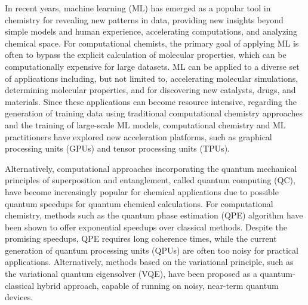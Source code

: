 \documentclass[journal=jacsat,manuscript=article]{achemso}
\begin{document}
In recent years, machine learning (ML) has emerged as a popular tool in chemistry for revealing new patterns in data, providing new insights beyond simple models and human experience, accelerating computations, and analyzing chemical space.
For computational chemists, the primary goal of applying ML is often to bypass the explicit calculation of molecular properties, which can be computationally expensive for large datasets.\cite{janet_machine_2020}
ML can be applied to a diverse set of applications including, but not limited to, accelerating molecular simulations\cite{behler_perspective_2016,ssmith_ani-1_2017,gao_torchani_2020}, determining molecular properties\cite{yang_analyzing_2019,ramakrishnan_quantum_2014,ramakrishnan_big_2015,hansen_machine_2015,unke_physnet_2019}, and for discovering new catalysts\cite{zhong_accelerated_2020,nandy_computational_2021,mjones_data-driven_2023}, drugs\cite{goh_deep_2017,yang_concepts_2019}, and materials.\cite{butler_machine_2018,sanchez-lengeling_inverse_2018,raccuglia_machine-learning-assisted_2016}
Since these applications can become resource intensive, regarding the generation of training data using traditional computational chemistry approaches and the training of large-scale ML models, computational chemistry and ML practitioners have explored new acceleration platforms, such as graphical processing units (GPUs) and tensor processing units (TPUs).\cite{ufimtsev_graphical_2008,gotz_chapter_2010,pederson_large_2023,goh_deep_2017,gawehn_advancing_2018,pandey_transformational_2022,ssmith_ani-1_2017}

Alternatively, computational approaches incorporating the quantum mechanical principles of superposition and entanglement, called quantum computing (QC), have become increasingly popular for chemical applications due to possible quantum speedups for quantum chemical calculations.\cite{cao_quantum_2019}
For computational chemistry, methods such as the quantum phase estimation (QPE)\cite{abrams_simulation_1997,abrams_quantum_1999,aspuru-guzik_simulated_2005,lanyon_towards_2010,whitfield_simulation_2011,aspuru-guzik_photonic_2012} algorithm have been shown to offer exponential speedups over classical methods.
Despite the promising speedups, QPE requires long coherence times, while the current generation of quantum processing units (QPUs) are often too noisy for practical applications.
Alternatively, methods based on the variational principle, such as the variational quantum eigensolver (VQE)\cite{peruzzo_variational_2014,cerezo_variational_2021,mcclean_theory_2016,bharti_noisy_2022}, have been proposed as a quantum-classical hybrid approach, capable of running on noisy, near-term quantum devices.
\end{document}
